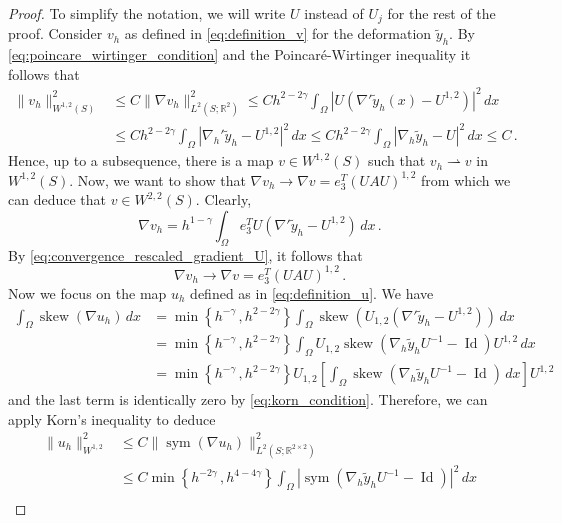 \documentclass{article}
\theoremstyle{plain}
\theoremstyle{plain}
\theoremstyle{plain}
\theoremstyle{plain}
\theoremstyle{plain}
\theoremstyle{definition}
\theoremstyle{definition}
\renewcommand{\r}{\mathbb{R}}
\newcommand{\todeb}{\rightharpoonup}
\DeclareMathOperator{\Id}{Id}
\DeclareMathOperator{\skw}{skew}
\DeclareMathOperator{\sym}{sym}
\begin{document}
\begin{proof}
    To simplify the notation, we will write $U$ instead of $U_j$ for the rest of the proof. Consider $v_h$ as defined in \eqref{eq:definition_v} for the deformation $\tilde y_h$. By \eqref{eq:poincare_wirtinger_condition} and the Poincaré-Wirtinger inequality it follows that
    \begin{align}
        \|v_h\|_{W^{1,2}(S)}^2 & \leq C\|\nabla v_h\|_{L^2(S; \r^2)}^2 \leq Ch^{2-2\gamma}\int_{\Omega} |U\left(\nabla' \tilde y_h(x) - U^{1,2}\right)|^2 \, dx\\
        & \leq Ch^{2-2\gamma}\int_{\Omega} \left|\nabla_h' \tilde y_h - U^{1,2}\right|^2 \, dx \leq Ch^{2-2\gamma}\int_{\Omega} |\nabla_h \tilde y_h - U|^2 \, dx \leq C \,.
    \end{align}
    Hence, up to a subsequence, there is a map $v \in W^{1,2}(S)$ such that $v_h \todeb v$ in $W^{1,2}(S)$. Now, we want to show that $\nabla v_h \to \nabla v = e_3^T{(UAU)}^{1,2}$ from which we can deduce that $v \in W^{2,2}(S)$. Clearly,
    \[
        \nabla v_h = h^{1-\gamma} \int_{\Omega} e_3^TU\left(\nabla' \tilde y_h - U^{1,2}\right) \, dx \,.
    \]
    By \eqref{eq:convergence_rescaled_gradient_U}, it follows that
    \begin{equation}\label{eq:structure_gradient_v}
        \nabla v_h \to \nabla v = e_3^T{(UAU)}^{1,2} \,.
    \end{equation}
    Now we focus on the map $u_h$ defined as in \eqref{eq:definition_u}. We have
    \begin{align}
        \int_{\Omega} \skw(\nabla u_h) \, dx & = \min \left\{h^{-\gamma} \,, h^{2 - 2\gamma}\right\} \int_\Omega \skw\left(U_{1,2}(\nabla' \tilde y_h - U^{1,2})\right) \, dx\\
        & = \min \left\{h^{-\gamma} \,, h^{2 - 2\gamma}\right\} \int_\Omega U_{1,2}\skw\left(\nabla_h \tilde y_h U^{-1} - \Id\right) U^{1,2} \, dx\\
        & =\min \left\{h^{-\gamma} \,, h^{2 - 2\gamma}\right\} U_{1,2} \left[ \int_\Omega \skw\left(\nabla_h \tilde y_h U^{-1} - \Id \right) \, dx \right] U^{1,2}
    \end{align}
    and the last term is identically zero by \eqref{eq:korn_condition}. Therefore, we can apply Korn's inequality to deduce
    \begin{align}
        \|u_h\|_{W^{1,2}}^2 & \leq C \|\sym(\nabla u_h)\|_{L^2(S; \r^{2 \times 2})}^2 \\
        & \leq C \min \left\{h^{-2\gamma} \,, h^{4 - 4\gamma}\right\} \int_\Omega \left|\sym(\nabla_h \tilde y_h U^{-1}  - \Id)\right|^2 \, dx \\

\end{align}
\end{proof}
\end{document}
